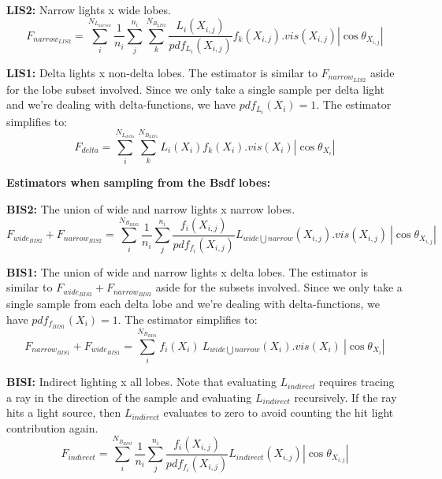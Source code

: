 \documentclass{article}
\begin{document}
\vspace{.2cm}
\textbf{LIS2:} Narrow lights x wide lobes.
\begin{equation}
F_{narrow_{LIS2}} =
    \sum_{i}^{N_{L_{narrow}}}  \frac{1}{n_i}  \sum_{j}^{n_i}  \sum_{k}^{N_{B_{LIS2}}}
        \frac{  L_i(X_{i,j}) }  { pdf_{L_i}(X_{i,j}) }
        f_k(X_{i,j}) . vis(X_{i,j})
        |\cos\theta_{X_{i,j}}|
\end{equation}

\textbf{LIS1:} Delta lights x non-delta lobes. The estimator is
similar to $F_{narrow_{LIS2}}$ aside for the lobe subset involved.
Since we only take a single sample per delta light and we're dealing
with delta-functions, we have $pdf_{L_i}(X_i) = 1$. The estimator
simplifies to:
\begin{equation}
F_{delta} =
    \sum_{i}^{N_{L_{delta}}}  \sum_{k}^{N_{B_{LIS1}}}
        L_i(X_i) f_k(X_i) . vis(X_i)
        |\cos\theta_{X_i}|
\end{equation}


\vspace{.5cm}
\textbf{Estimators when sampling from the Bsdf lobes:}

\vspace{.2cm}
\textbf{BIS2:} The union of wide and narrow lights x narrow lobes.
\begin{equation}
F_{wide_{BIS2}} + F_{narrow_{BIS2}} =
    \sum_{i}^{N_{B_{BIS2}}}  \frac{1}{n_i}  \sum_{j}^{n_i}
        \frac{  f_i(X_{i,j}) }  { pdf_{f_i}(X_{i,j}) }
        L_{wide \bigcup narrow}(X_{i,j}) . vis(X_{i,j})\ 
        |\cos\theta_{X_{i,j}}|
\end{equation}

\vspace{.2cm}
\textbf{BIS1:} The union of wide and narrow lights x delta lobes. The
estimator is similar to $F_{wide_{BIS2}} + F_{narrow_{BIS2}}$ aside for the
subsets involved. Since we only take a single sample from each delta
lobe and we're dealing with delta-functions, we have
$pdf_{f_{BIS1}}(X_i) = 1$. The estimator simplifies to:
\begin{equation}
F_{narrow_{BIS1}} + F_{wide_{BIS1}} =
    \sum_{i}^{N_{B_{BIS1}}}
        f_i(X_i) \ 
        L_{wide \bigcup narrow}(X_i) . vis(X_i)\ 
        |\cos\theta_{X_i}|
\end{equation}

\vspace{.2cm}
\textbf{BISI:} Indirect lighting x all lobes. Note that evaluating
$L_{indirect}$ requires tracing a ray in the direction of the sample and
evaluating $L_{indirect}$ recursively. If the ray hits a light source, then
$L_{indirect}$ evaluates to zero to avoid counting the hit light contribution
again.
\begin{equation}
F_{indirect} =
    \sum_{i}^{N_{B_{BISI}}}  \frac{1}{n_i}  \sum_{j}^{n_i}
        \frac{  f_i(X_{i,j}) }  { pdf_{f_i}(X_{i,j}) }
        L_{indirect}(X_{i,j})
        |\cos\theta_{X_{i,j}}|
\end{equation}
\end{document}
